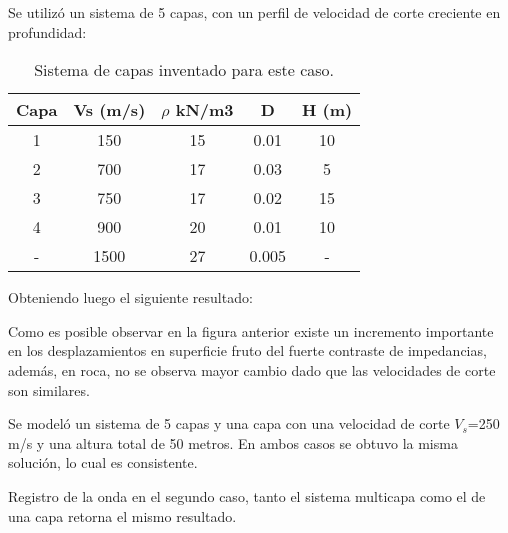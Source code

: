 
Se utilizó un sistema de 5 capas, con un perfil de velocidad de corte creciente en profundidad:

\begin{table}[H]
	\centering
	\caption{Sistema de capas inventado para este caso.}
	\begin{tabular}{ccccc}
		\hline
		\textbf{Capa} & \textbf{Vs (m/s)} & \boldmath{}\textbf{$\rho$ kN/m3}\unboldmath{} & \textbf{D} & \textbf{H (m)} \bigstrut\\
		\hline
		1     & 150   & 15    & 0.01  & 10 \bigstrut[t]\\
		2     & 700   & 17    & 0.03  & 5 \\
		3     & 750   & 17    & 0.02  & 15 \\
		4     & 900   & 20    & 0.01  & 10 \\
		-     & 1500  & 27    & 0.005 & - \bigstrut[b]\\
		\hline
	\end{tabular}
\end{table}

Obteniendo luego el siguiente resultado:


Como es posible observar en la figura anterior existe un incremento importante en los desplazamientos en superficie fruto del fuerte contraste de impedancias, además, en roca, no se observa mayor cambio dado que las velocidades de corte son similares.

\clearpage
{}

Se modeló un sistema de 5 capas y una capa con una velocidad de corte $V_s$=250 m/s y una altura total de 50 metros. En ambos casos se obtuvo la misma solución, lo cual es consistente.

\begin{images}[\label{p2segundocaso}]{Registro de la onda en el segundo caso, tanto el sistema multicapa como el de una capa retorna el mismo resultado.}
\end{images}